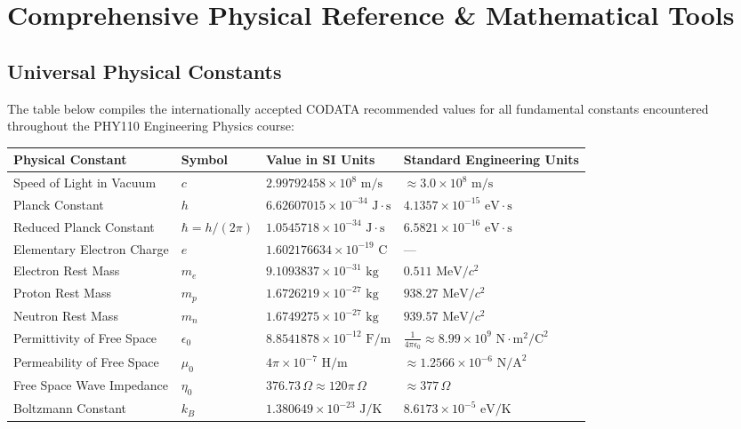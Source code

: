 \chapter{Comprehensive Physical Reference \& Mathematical Tools}

\section{Universal Physical Constants}
The table below compiles the internationally accepted CODATA recommended values for all fundamental constants encountered throughout the PHY110 Engineering Physics course:

\begin{center}
\small
\begin{tabularx}{\textwidth}{l l l X}
\toprule
\textbf{Physical Constant} & \textbf{Symbol} & \textbf{Value in SI Units} & \textbf{Standard Engineering Units} \\
\midrule
Speed of Light in Vacuum & $c$ & $2.99792458 \times 10^8\text{ m/s}$ & $\approx 3.0 \times 10^8\text{ m/s}$ \\
Planck Constant & $h$ & $6.62607015 \times 10^{-34}\text{ J}\cdot\text{s}$ & $4.1357 \times 10^{-15}\text{ eV}\cdot\text{s}$ \\
Reduced Planck Constant & $\hbar = h/(2\pi)$ & $1.0545718 \times 10^{-34}\text{ J}\cdot\text{s}$ & $6.5821 \times 10^{-16}\text{ eV}\cdot\text{s}$ \\
Elementary Electron Charge & $e$ & $1.602176634 \times 10^{-19}\text{ C}$ & --- \\
Electron Rest Mass & $m_e$ & $9.1093837 \times 10^{-31}\text{ kg}$ & $0.511\text{ MeV}/c^2$ \\
Proton Rest Mass & $m_p$ & $1.6726219 \times 10^{-27}\text{ kg}$ & $938.27\text{ MeV}/c^2$ \\
Neutron Rest Mass & $m_n$ & $1.6749275 \times 10^{-27}\text{ kg}$ & $939.57\text{ MeV}/c^2$ \\
Permittivity of Free Space & $\epsilon_0$ & $8.8541878 \times 10^{-12}\text{ F/m}$ & $\frac{1}{4\pi\epsilon_0} \approx 8.99 \times 10^9\text{ N}\cdot\text{m}^2/\text{C}^2$ \\
Permeability of Free Space & $\mu_0$ & $4\pi \times 10^{-7}\text{ H/m}$ & $\approx 1.2566 \times 10^{-6}\text{ N/A}^2$ \\
Free Space Wave Impedance & $\eta_0$ & $376.73\,\Omega \approx 120\pi\,\Omega$ & $\approx 377\,\Omega$ \\
Boltzmann Constant & $k_B$ & $1.380649 \times 10^{-23}\text{ J/K}$ & $8.6173 \times 10^{-5}\text{ eV/K}$ \\

\end{tabularx}
\end{center}
